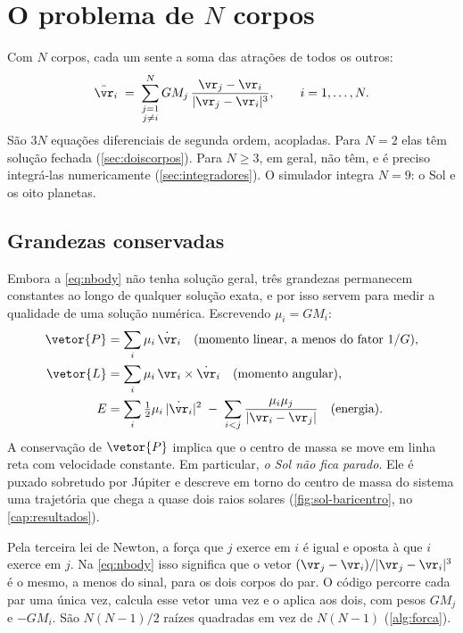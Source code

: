 \section{O problema de \texorpdfstring{$N$}{N} corpos}\label{sec:nbody}

Com $N$ corpos, cada um sente a soma das atrações de todos os outros:
\begin{equation}
  \ddot{\vr}_i \;=\; \sum_{\substack{j=1\\ j\neq i}}^{N} GM_j\,\frac{\vr_j-\vr_i}{|\vr_j-\vr_i|^3},
  \qquad i = 1,\dots,N.
  \label{eq:nbody}
\end{equation}
São $3N$ equações diferenciais de segunda ordem, acopladas. Para $N=2$ elas têm solução fechada (\autoref{sec:doiscorpos}). Para $N\geq 3$, em geral, não têm, e é preciso integrá-las numericamente (\autoref{sec:integradores}). O simulador integra $N=9$: o Sol e os oito planetas.

\subsection{Grandezas conservadas}

Embora a \autoref{eq:nbody} não tenha solução geral, três grandezas permanecem constantes ao longo de qualquer solução exata, e por isso servem para medir a qualidade de uma solução numérica. Escrevendo $\mu_i = GM_i$:
\begin{align}
  \vetor{P} &= \sum_i \mu_i\,\dot{\vr}_i \quad\text{(momento linear, a menos do fator $1/G$)},\\
  \vetor{L} &= \sum_i \mu_i\,\vr_i\times\dot{\vr}_i \quad\text{(momento angular)},\\
  E &= \sum_i \tfrac12\mu_i\,|\dot{\vr}_i|^2 \;-\; \sum_{i<j}\frac{\mu_i\mu_j}{|\vr_i-\vr_j|} \quad\text{(energia)}.
  \label{eq:energia}
\end{align}
A conservação de $\vetor{P}$ implica que o centro de massa se move em linha reta com velocidade constante. Em particular, \emph{o Sol não fica parado}. Ele é puxado sobretudo por Júpiter e descreve em torno do centro de massa do sistema uma trajetória que chega a quase dois raios solares (\autoref{fig:sol-baricentro}, no \autoref{cap:resultados}).

\begin{paraaprofundar}
Pela terceira lei de Newton, a força que $j$ exerce em $i$ é igual e oposta à que $i$ exerce em $j$. Na \autoref{eq:nbody} isso significa que o vetor $(\vr_j-\vr_i)/|\vr_j-\vr_i|^3$ é o mesmo, a menos do sinal, para os dois corpos do par. O código percorre cada par uma única vez, calcula esse vetor uma vez e o aplica aos dois, com pesos $GM_j$ e $-GM_i$. São $N(N-1)/2$ raízes quadradas em vez de $N(N-1)$ (\autoref{alg:forca}).
\end{paraaprofundar}

